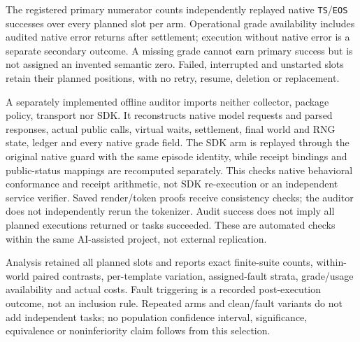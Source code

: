 The registered primary numerator counts independently replayed native
\texttt{TS}/\texttt{EOS} successes over every planned slot per arm. Operational
grade availability includes audited native error returns after settlement;
execution without native error is a separate secondary outcome. A missing grade
cannot earn primary success but is not assigned an invented semantic zero.
Failed, interrupted and unstarted slots retain their planned positions, with
no retry, resume, deletion or replacement.

A separately implemented offline auditor imports neither collector, package
policy, transport nor SDK. It reconstructs native model requests and parsed
responses, actual public calls, virtual waits, settlement, final world and RNG
state, ledger and every native grade field. The SDK arm is replayed through the
original native guard with the same episode identity, while receipt bindings
and public-status mappings are recomputed separately. This checks native
behavioral conformance and receipt arithmetic, not SDK re-execution or an
independent service verifier. Saved render/token proofs receive consistency
checks; the auditor does not independently rerun the tokenizer. Audit success
does not imply all planned executions returned or tasks succeeded. These are
automated checks within the same AI-assisted project, not external replication.

Analysis retained all planned slots and reports exact finite-suite counts,
within-world paired contrasts, per-template variation, assigned-fault strata,
grade/usage availability and actual costs. Fault triggering is a recorded
post-execution outcome, not an inclusion rule. Repeated arms and clean/fault
variants do not add independent tasks; no population confidence interval,
significance, equivalence or noninferiority claim follows from this selection.
